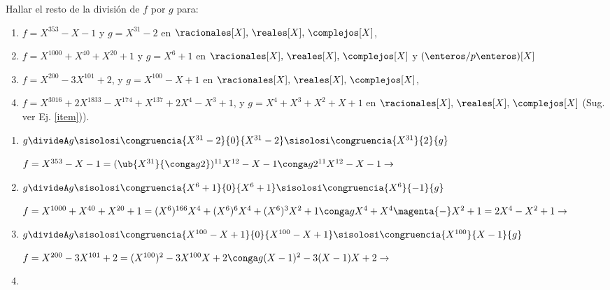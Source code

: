 \ejercicio

Hallar el resto de la división de $f$ por $g$ para:

\begin{enumerate}[label=\roman*)]
	\item $f = X^{353} - X - 1$ y $g = X^{31} - 2$ en $\racionales[X],\,\reales[X],\,\complejos[X]$,

	\item $f = X^{1000} + X^{40} + X^{20}  + 1$ y $g = X^6 + 1$ en $\racionales[X],\,\reales[X],\,\complejos[X]$ y $(\enteros/p\enteros)[X]$

	\item $f = X^{200} - 3X^{101} + 2$, y $g = X^{100} - X + 1$ en $\racionales[X],\,\reales[X],\,\complejos[X]$,

	\item $f = X^{3016} + 2X^{1833} - X^{174} + X^{137} + 2X^4 - X^3 + 1$, y $g = X^4 + X^3 +X^2 + X + 1$ en $\racionales[X],\,\reales[X],\,\complejos[X]$
	      (Sug. ver Ej.  \ref{item})).
\end{enumerate}

\separadorCorto

\begin{enumerate}[label=\roman*)]
	\item $g \divideA g \sisolosi \congruencia{X^{31} - 2}{ 0 }{X^{31} - 2} \sisolosi \congruencia{X^{31}}{2}{g}$

	      $f = X^{353} - X - 1 =
		      (\ub{X^{31}}{\conga g 2})^{11} X^{12} - X - 1 \conga g
		      2^{11} X^{12} -X -1
		      \to $

	\item
	      $g \divideA g
		      \sisolosi
		      \congruencia{X^6 + 1}{ 0 }{X^6 + 1}
		      \sisolosi
		      \congruencia{X^6}{-1}{g}$

	      $f =
		      X^{1000} + X^{40} + X^{20}  + 1 =
		      (X^6)^{166}X^4 + (X^6)^6 X^4 + (X^6)^3 X^2  + 1 \conga g
		      X^4 + X^4 \magenta{-} X^2  + 1 =
		      2X^4 - X^2 + 1\\
		      \to$
	      \\

	\item
	      $g \divideA g
		      \sisolosi
		      \congruencia{X^{100} - X + 1}{0}{X^{100} - X + 1}
		      \sisolosi
		      \congruencia{X^{100}}{X - 1}{g}$

	      $f =
		      X^{200} - 3X^{101} + 2 =
		      (X^{100})^2 - 3 X^{100} X + 2 \conga g
		      (X - 1)^2 - 3 (X - 1) X + 2
		      \\
		      \to$

	\item 
          \Hacer

\end{enumerate}
